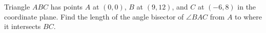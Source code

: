 Triangle $ABC$ has points $A$ at $(0,0)$, $B$ at $(9,12)$, and $C$ at $(-6,8)$ in the coordinate plane. Find the length of the angle bisector of $\angle{BAC}$ from $A$ to where it intersects $BC$.